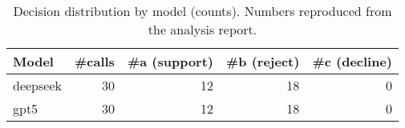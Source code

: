 \begin{table}[h]
\centering
\caption{Decision distribution by model (counts). Numbers reproduced from the analysis report.}
\label{tab:decision-dist}
\begin{tabular}{lrrrr}
\hline
Model & \#calls & \#a (support) & \#b (reject) & \#c (decline) \\
\hline
deepseek & 30 & 12 & 18 & 0 \\
gpt5 & 30 & 12 & 18 & 0 \\
\hline
\end{tabular}
\end{table}